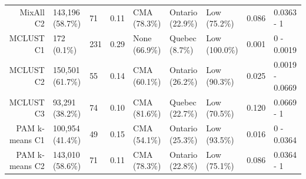\documentclass[11pt, a4paper]{article}
\begin{document}
\begin{table}[H]
{\begin{tabular}{|r|llllllll|}
  MixAll C2 & 143,196 (58.7\%) & 71 & 0.11 & CMA (78.3\%) & Ontario (22.9\%) & Low (75.2\%) & 0.086 & 0.0363 - 1 \\
\rowcolor{gray!25}  MCLUST C1 & 172 (0.1\%) & 231 & 0.29 & None (66.9\%) & Quebec (8.7\%) & Low (100.0\%) & 0.001 & 0 - 0.0019 \\
\rowcolor{gray!25}  MCLUST C2 & 150,501 (61.7\%) & 55 & 0.14 & CMA (60.1\%) & Ontario (26.2\%) & Low (90.3\%) & 0.025 & 0.0019 - 0.0669 \\
 \rowcolor{gray!25} MCLUST C3 & 93,291 (38.2\%) & 74 & 0.10 & CMA (81.6\%) & Quebec (22.7\%) & Low (70.5\%) & 0.120 & 0.0669 - 1 \\
  PAM k-means C1 & 100,954 (41.4\%) & 49 & 0.15 & CMA (54.1\%) & Ontario (25.3\%) & Low (93.5\%) & 0.016 & 0 - 0.0364 \\
  PAM k-means C2 & 143,010 (58.6\%) & 71 & 0.11 & CMA (78.3\%) & Ontario (22.8\%) & Low (75.1\%) & 0.086 & 0.0364 - 1 \\
   \hline
\end{tabular}
}
\end{table}
\end{document}
